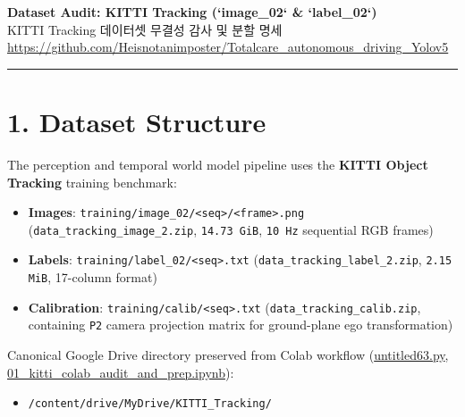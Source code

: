 \documentclass[10.5pt,a4paper]{article}
\begin{document}
\begin{center}
{\LARGE\bfseries Dataset Audit: KITTI Tracking (`image\_02` \& `label\_02`)}\\[6pt]
{\normalsize\color{gray} KITTI Tracking 데이터셋 무결성 감사 및 분할 명세}\\[4pt]
{\small\href{https://github.com/Heisnotanimposter/Totalcare_autonomous_driving_Yolov5}{https://github.com/Heisnotanimposter/Totalcare\_autonomous\_driving\_Yolov5}}
\end{center}
\vspace{4pt}
\hrule
\vspace{8pt}

\section{1. Dataset Structure}

The perception and temporal world model pipeline uses the \textbf{KITTI Object Tracking} training benchmark:

\begin{itemize}[leftmargin=1.5em,itemsep=2pt]
\item \textbf{Images}: \texttt{training/\allowbreak{}image\_\allowbreak{}02/\allowbreak{}<seq>/\allowbreak{}<frame>.\allowbreak{}png} (\texttt{data\_\allowbreak{}tracking\_\allowbreak{}image\_\allowbreak{}2.\allowbreak{}zip}, \texttt{14.\allowbreak{}73 GiB}, \texttt{10 Hz} sequential RGB frames)
\item \textbf{Labels}: \texttt{training/\allowbreak{}label\_\allowbreak{}02/\allowbreak{}<seq>.\allowbreak{}txt} (\texttt{data\_\allowbreak{}tracking\_\allowbreak{}label\_\allowbreak{}2.\allowbreak{}zip}, \texttt{2.\allowbreak{}15 MiB}, 17-column format)
\item \textbf{Calibration}: \texttt{training/\allowbreak{}calib/\allowbreak{}<seq>.\allowbreak{}txt} (\texttt{data\_\allowbreak{}tracking\_\allowbreak{}calib.\allowbreak{}zip}, containing \texttt{P2} camera projection matrix for ground-plane ego transformation)
\end{itemize}

Canonical Google Drive directory preserved from Colab workflow (\href{https://github.com/Heisnotanimposter/Totalcare\_autonomous\_driving\_Yolov5/blob/main/untitled63.py}{untitled63.py}, \href{https://github.com/Heisnotanimposter/Totalcare\_autonomous\_driving\_Yolov5/blob/main/colab/01\_kitti\_colab\_audit\_and\_prep.ipynb}{01\_kitti\_colab\_audit\_and\_prep.ipynb}):

\begin{itemize}[leftmargin=1.5em,itemsep=2pt]
\item \texttt{/\allowbreak{}content/\allowbreak{}drive/\allowbreak{}MyDrive/\allowbreak{}KITTI\_\allowbreak{}Tracking/\allowbreak{}}
\end{itemize}
\end{document}
